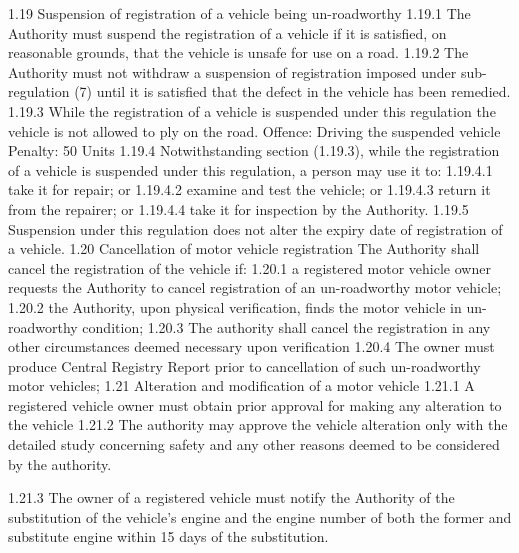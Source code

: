 \documentclass[
]{book}
\begin{document}
1.19 Suspension of registration of a vehicle being un-roadworthy
1.19.1 The Authority must suspend the registration of a vehicle if it is satisfied, on reasonable grounds, that the vehicle is unsafe for use on a road.
1.19.2 The Authority must not withdraw a suspension of registration imposed under sub-regulation (7) until it is satisfied that the defect in the vehicle has been remedied.
1.19.3 While the registration of a vehicle is suspended under this regulation the vehicle is not allowed to ply on the road.
Offence: Driving the suspended vehicle
Penalty: 50 Units
1.19.4 Notwithstanding section (1.19.3), while the registration of a vehicle is suspended under this regulation, a person may use it to:
1.19.4.1 take it for repair; or
1.19.4.2 examine and test the vehicle; or
1.19.4.3 return it from the repairer; or
1.19.4.4 take it for inspection by the Authority.
1.19.5 Suspension under this regulation does not alter the expiry date of registration of a vehicle.
1.20 Cancellation of motor vehicle registration
The Authority shall cancel the registration of the vehicle if:
1.20.1 a registered motor vehicle owner requests the Authority to cancel registration of an un-roadworthy motor vehicle;
1.20.2 the Authority, upon physical verification, finds the motor vehicle in un-roadworthy condition;
1.20.3 The authority shall cancel the registration in any other circumstances deemed necessary upon verification
1.20.4 The owner must produce Central Registry Report prior to cancellation of such un-roadworthy motor vehicles;
1.21 Alteration and modification of a motor vehicle
1.21.1 A registered vehicle owner must obtain prior approval for making any alteration to the vehicle
1.21.2 The authority may approve the vehicle alteration only with the detailed study concerning safety and any other reasons deemed to be considered by the authority.

1.21.3 The owner of a registered vehicle must notify the Authority of the substitution of the vehicle's engine and the engine number of both the former and substitute engine within 15 days of the substitution.
\end{document}
